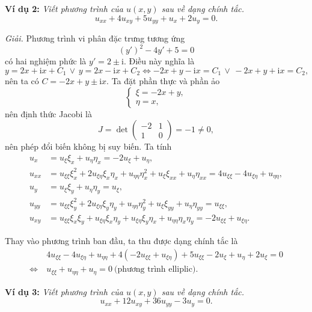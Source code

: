 \documentclass[10pt, a4paper]{article}
\begin{document}
	\textbf{Ví dụ 2:} \textit{Viết phương trình của $u(x,y)$ sau về dạng chính tắc.} $$u_{xx}+4u_{xy}+5u_{yy}+u_x+2u_y=0.$$
	
	\textit{Giải.} Phương trình vi phân đặc trưng tương ứng $$(y')^2-4y'+5=0$$
	có hai nghiệm phức là $y'=2\pm\mathrm i$. Điều này nghĩa là $$y=2x+\mathrm ix+C_1\,\lor\,y=2x-\mathrm ix+C_2\iff-2x+y-\mathrm ix=C_1\,\lor\,-2x+y+\mathrm ix=C_2,$$
	nên ta có $C=-2x+y\pm\mathrm ix$. Ta đặt phần thực và phần ảo $$\begin{cases}
		\xi=-2x+y,\\
		\eta=x,
	\end{cases}$$
	nên định thức Jacobi là $$J=\det\begin{pmatrix}
		-2&1\\1&0
	\end{pmatrix}=-1\ne0,$$
	nên phép đổi biến không bị suy biến. Ta tính \begin{align*}
		u_x&=u_\xi\xi_x+u_\eta\eta_x=-2u_\xi+u_\eta,\\
		u_{xx}&=u_{\xi\xi}\xi_x^2+2u_{\xi\eta}\xi_x\eta_x+u_{\eta\eta}\eta_x^2+u_\xi\xi_{xx}+u_\eta\eta_{xx}=4u_{\xi\xi}-4u_{\xi\eta}+u_{\eta\eta},\\
		u_y&=u_\xi\xi_y+u_\eta\eta_y=u_\xi,\\
		u_{yy}&=u_{\xi\xi}\xi_y^2+2u_{\xi\eta}\xi_y\eta_y+u_{\eta\eta}\eta_y^2+u_\xi\xi_{yy}+u_\eta\eta_{yy}=u_{\xi\xi},\\
		u_{xy}&=u_{\xi\xi}\xi_x\xi_y+u_{\xi\eta}\xi_x\eta_y+u_{\xi\eta}\xi_y\eta_x+u_{\eta\eta}\eta_x\eta_y=-2u_{\xi\xi}+u_{\xi\eta}.
	\end{align*}
	
	Thay vào phương trình ban đầu, ta thu được dạng chính tắc là \begin{align*}
		&4u_{\xi\xi}-4u_{\xi\eta}+u_{\eta\eta}+4(-2u_{\xi\xi}+u_{\xi\eta})+5u_{\xi\xi}-2u_\xi+u_\eta+2u_\xi=0\\
		\Leftrightarrow~&u_{\xi\xi}+u_{\eta\eta}+u_\eta=0~\text{(phương trình elliplic)}.
	\end{align*}
	
	\textbf{Ví dụ 3:} \textit{Viết phương trình của $u(x,y)$ sau về dạng chính tắc.} $$u_{xx}+12u_{xy}+36u_{yy}-3u_y=0.$$
	
\end{document}
